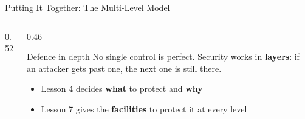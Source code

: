 \documentclass[aspectratio=169,11pt,xcolor={table}]{beamer}
\begin{document}
\begin{frame}{Putting It Together: The Multi-Level Model}
  \begin{columns}[c]
    \begin{column}{0.52\textwidth}
      \centering
    \end{column}
    \begin{column}{0.46\textwidth}
      \begin{block}{Defence in depth}
        \small No single control is perfect. Security works in \textbf{layers}: if an attacker gets past one, the next one is still there.
      \end{block}
      \vspace{2mm}
      \begin{itemize}\small\setlength{\itemsep}{3pt}
        \item Lesson 4 decides \textbf{what} to protect and \textbf{why}
        \item Lesson 7 gives the \textbf{facilities} to protect it at every level
      \end{itemize}
    \end{column}
  \end{columns}
\end{frame}
\end{document}
